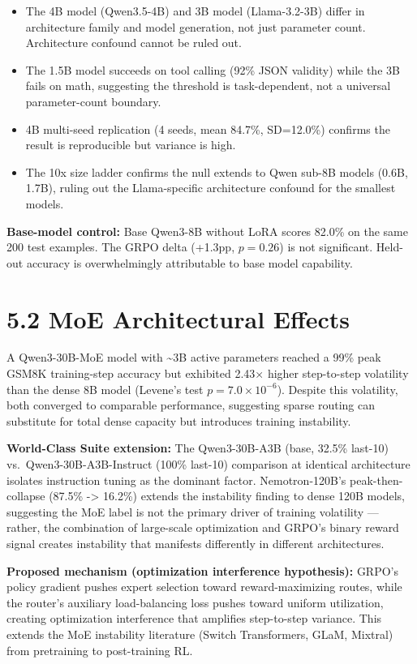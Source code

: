 \documentclass[
  american,
  11pt,
  a4paper,
  oneside]{report}
\providecommand{\tightlist}{%
  \setlength{\itemsep}{0pt}\setlength{\parskip}{0pt}}
\begin{document}
\begin{itemize}
\tightlist
\item
  The 4B model (Qwen3.5-4B) and 3B model (Llama-3.2-3B) differ in
  architecture family and model generation, not just parameter count.
  Architecture confound cannot be ruled out.
\item
  The 1.5B model succeeds on tool calling (92\% JSON validity) while the
  3B fails on math, suggesting the threshold is task-dependent, not a
  universal parameter-count boundary.
\item
  4B multi-seed replication (4 seeds, mean 84.7\%, SD=12.0\%) confirms
  the result is reproducible but variance is high.
\item
  The 10x size ladder confirms the null extends to Qwen sub-8B models
  (0.6B, 1.7B), ruling out the Llama-specific architecture confound for
  the smallest models.
\end{itemize}

\textbf{Base-model control:} Base Qwen3-8B without LoRA scores 82.0\% on
the same 200 test examples. The GRPO delta (+1.3pp, \(p{=}0.26\)) is not
significant. Held-out accuracy is overwhelmingly attributable to base
model capability.

\section{5.2 MoE Architectural Effects}\label{moe-architectural-effects}

A Qwen3-30B-MoE model with \textasciitilde3B active parameters reached a
99\% peak GSM8K training-step accuracy but exhibited 2.43× higher
step-to-step volatility than the dense 8B model (Levene's test
\(p = 7.0 \times 10^{-6}\)). Despite this volatility, both converged to
comparable performance, suggesting sparse routing can substitute for
total dense capacity but introduces training instability.

\textbf{World-Class Suite extension:} The Qwen3-30B-A3B (base, 32.5\%
last-10) vs.~Qwen3-30B-A3B-Instruct (100\% last-10) comparison at
identical architecture isolates instruction tuning as the dominant
factor. Nemotron-120B's peak-then-collapse (87.5\% -\textgreater{}
16.2\%) extends the instability finding to dense 120B models, suggesting
the MoE label is not the primary driver of training volatility ---
rather, the combination of large-scale optimization and GRPO's binary
reward signal creates instability that manifests differently in
different architectures.

\textbf{Proposed mechanism (optimization interference hypothesis):}
GRPO's policy gradient pushes expert selection toward reward-maximizing
routes, while the router's auxiliary load-balancing loss pushes toward
uniform utilization, creating optimization interference that amplifies
step-to-step variance. This extends the MoE instability literature
(Switch Transformers, GLaM, Mixtral) from pretraining to post-training
RL.
\end{document}
